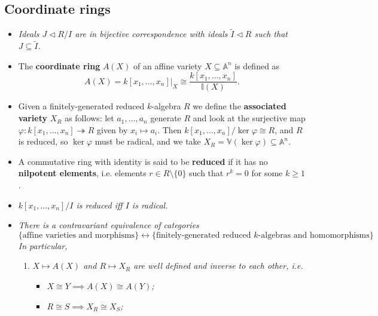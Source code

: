 \documentclass[10pt]{article}
\newcommand{\epi}{\twoheadrightarrow}
\newcommand{\van}{\mathbb{V}}
\newcommand{\ide}{\mathbb{I}}
\newcommand{\aff}{\mathbb{A}}
\newcommand{\kon}{{k[x_1,\ldots,x_n]}}
\begin{document}
        \subsection{Coordinate rings}

            \begin{itemize}
                \item \emph{Ideals $J\triangleleft R/I$ are in bijective correspondence with ideals $\tilde{I}\triangleleft R$ such that $J\subseteq\tilde{I}$.}
                \item The \textbf{coordinate ring} $A(X)$ of an affine variety $X\subseteq\aff^n$ is defined as
                \begin{equation*}
                    A(X)=\kon\Big|_X\cong\frac{\kon}{\ide(X)}.
                \end{equation*}
                \item Given a finitely-generated reduced $k$-algebra $R$ we define the \textbf{associated variety} $X_R$ as follows: let $a_1,\ldots,a_n$ generate $R$ and look at the surjective map $\varphi\colon\kon\epi R$ given by $x_i\mapsto a_i$.
                Then $\kon/\ker\varphi\cong R$, and $R$ is reduced, so $\ker\varphi$ must be radical, and we take $X_R=\van(\ker\varphi)\subseteq\aff^n$.
                \item A commutative ring with identity is said to be \textbf{reduced} if it has no \textbf{nilpotent elements}, i.e. elements $r\in R\setminus\{0\}$ such that $r^k=0$ for some $k\geqslant1$.
                \item \emph{$\kon/I$ is reduced iff $I$ is radical.}
                \item \emph{There is a contravariant equivalence of categories}
                    \begin{equation*}
                        \{\text{affine varieties and morphisms}\}\leftrightarrow\{\text{finitely-generated reduced $k$-algebras and homomorphisms}\}
                    \end{equation*}
                    \emph{In particular,}
                    \begin{enumerate}
                        \item \emph{$X\mapsto A(X)$ and $R\mapsto X_R$ are well defined and inverse to each other, i.e.}
                        \begin{itemize}
                            \item $X\cong Y\implies A(X)\cong A(Y)$\emph{;}
                            \item $R\cong S\implies X_R\cong X_S$\emph{;}

\end{itemize}
\end{enumerate}
\end{itemize}
\end{document}
